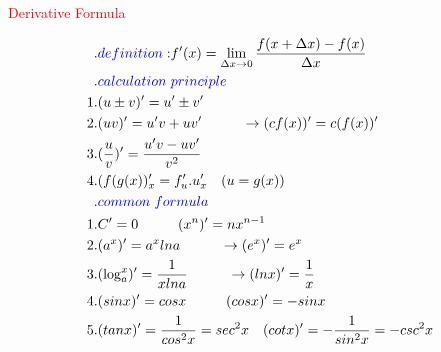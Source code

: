 \documentclass{standalone}
\begin{document}
\begin{minipage}[b][14cm][t]{1.00\textwidth}
\begin{center}\textcolor{red}{\huge{Derivative Formula}}\end{center}
\begin{Large}\begin{align*}
&.\textcolor{blue}{definition:}f'(x)=\lim_{\Delta{x}\to{0}}\frac{f(x+\Delta{x})-f(x)}{\Delta{x}}\\
&.\textcolor{blue}{calculation\hspace{3pt}principle}\\
1&.(u\pm{v})' = u'\pm{v'}\\
2&.(uv)' = u'v + uv'\hspace{1cm}\rightarrow(cf(x))'=c(f(x))'\\
3&.(\frac{u}{v})' = \frac{u'v-uv'}{v^2}\\
4&.(f(g(x))_x' = f'_{u}.u'_{x}\hspace{10pt}(u=g(x))\\
&.\textcolor{blue}{common\hspace{3pt}formula}\\
1&.C'=0\hspace{1cm}(x^n)'=nx^{n-1}\\
2&.(a^x)'=a^xlna\hspace{1cm}\rightarrow(e^x)'=e^x\\
3&.(\log_a^x)'=\frac{1}{xlna}\hspace{1cm}\rightarrow(lnx)'=\frac{1}{x}\\
4&.(sinx)'=cosx\hspace{1cm}(cosx)'=-sinx\\
5&.(tanx)'=\frac{1}{cos^2x}=sec^2x\hspace{10pt}(cotx)'=-\frac{1}{sin^2x}=-csc^2x
\end{align*}\end{Large}
\end{minipage}
\end{document}
